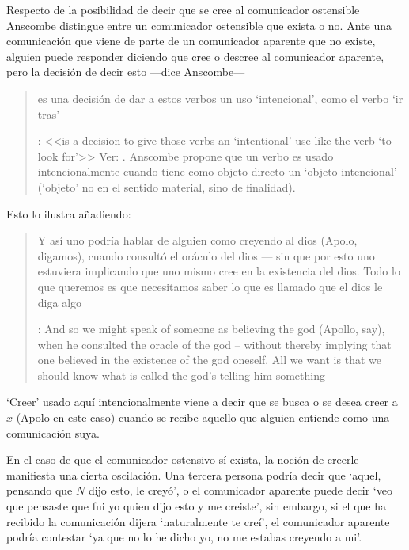 Respecto de la posibilidad de decir que se cree al comunicador ostensible Anscombe distingue entre un comunicador ostensible que exista o no. Ante una comunicación que viene de parte de un comunicador aparente que no existe, alguien puede responder diciendo que cree o descree al comunicador aparente, pero la decisión de decir esto ---dice Anscombe--- \blockquote[{\cite[7]{anscombe2008faith:tobelieve}}: <<is a decision to give those verbs an `intentional' use like the verb `to look for'>> Ver: {\cite{anscombe1981metaphysics:intsens}}. Anscombe propone que un verbo es usado intencionalmente cuando tiene como objeto directo un `objeto intencional' (`objeto' no en el sentido material, sino de finalidad).]{es una decisión de dar a estos verbos un uso `intencional', como el verbo `ir tras'}. Esto lo ilustra añadiendo: \blockquote[{\cite[7]{anscombe2008faith:tobelieve}}: And so we might speak of someone as believing the god (Apollo, say), when he consulted the oracle of the god -- without thereby implying that one believed in the existence of the god oneself. All we want is that we should know what is called the god's telling him something]{Y así uno podría hablar de alguien como creyendo al dios (Apolo, digamos), cuando consultó el oráculo del dios --- sin que por esto uno estuviera implicando que uno mismo cree en la existencia del dios. Todo lo que queremos es que necesitamos saber lo que es llamado que el dios le diga algo}. `Creer' usado aquí intencionalmente viene a decir que se busca o se desea creer a $x$ (Apolo en este caso) cuando se recibe aquello que alguien entiende como una comunicación suya.

En el caso de que el comunicador ostensivo sí exista, la noción de creerle manifiesta una cierta oscilación. Una tercera persona podría decir que `aquel, pensando que $N$ dijo esto, le creyó', o el comunicador aparente puede decir `veo que pensaste que fui yo quien dijo esto y me creiste', sin embargo, si el que ha recibido la comunicación dijera `naturalmente te creí', el comunicador aparente podría contestar `ya que no lo he dicho yo, no me estabas creyendo a mi'.


